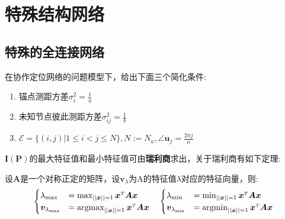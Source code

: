 \chapter{特殊结构网络}\label{cha:content4}
\section{特殊的全连接网络}\label{section:complete_graph_cooperation}
在协作定位网络的问题模型下，给出下面三个简化条件:
\begin{enumerate}
\item 锚点测距方差$\sigma_i^2=\frac{1}{a}$
\item 未知节点彼此测距方差$\sigma^2_{ij}=\frac{1}{b}$
\item $\mathcal{E}=\{(i,j)|1\leq i <j\leq N\},N:=N_a,\angle\bm{u}_j=\frac{2\pi j}{n}$
\end{enumerate}
$\bm{I}(\bm{P})$的最大特征值和最小特征值可由\textbf{瑞利商}求出，关于瑞利商有如下定理:
\begin{theorem}\label{theorem:rayleigh}
  设$\bm{A}$是一个对称正定的矩阵，设$\bm{v}_{\lambda}$为A的特征值$\lambda$对应的特征向量，则:
\begin{align*}
\begin{cases}
\lambda_{\text{max}}&=\max_{||\bm{x}||=1} \bm{x}^{\scriptscriptstyle T}\bm{A}\bm{x}\\
\bm{v}_{\lambda_{\text{max}}}&=\operatorname*{argmax}_{||\bm{x}||=1} \bm{x}^{\scriptscriptstyle T}\bm{A}\bm{x}
\end{cases}\quad
\begin{cases}
\lambda_{\text{min}}&=\min_{||\bm{x}||=1} \bm{x}^{\scriptscriptstyle T}\bm{A}\bm{x}\\
\bm{v}_{\lambda_{\text{min}}}&=\operatorname*{argmin}_{||\bm{x}||=1} \bm{x}^{\scriptscriptstyle T}\bm{A}\bm{x}
\end{cases}
\end{align*}
\end{theorem}


